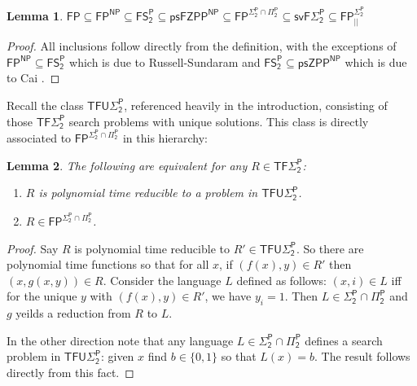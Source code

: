 \documentclass[11pt]{article}
\newtheorem{lemma}{Lemma}
\newcommand{\B}{\{0,1\}}
\begin{document}
\begin{lemma}\label{lem:inclusions}
$\mathsf{FP} \subseteq \mathsf{FP^{NP}} \subseteq \mathsf{FS_2^P} \subseteq \mathsf{psFZPP^{NP}} \subseteq \mathsf{FP^{\Sigma_2^P \cap \Pi_2^P}} \subseteq \mathsf{svF\Sigma_2^P} \subseteq \mathsf{FP_{||}^{\Sigma_2^P}}$
\end{lemma}
\begin{proof}
All inclusions follow directly from the definition, with the exceptions of $\mathsf{FP^{NP}} \subseteq \mathsf{FS_2^P}$ which is due to Russell-Sundaram \cite{russell-sundaram} and $\mathsf{FS_2^P} \subseteq \mathsf{psZPP^{NP}}$ which is due to Cai \cite{cai}.
\end{proof}

Recall the class $\mathsf{TFU\Sigma_2^P}$, referenced heavily in the introduction, consisting of those $\mathsf{TF\Sigma_2^P}$ search problems with unique solutions. This class is directly associated to $\mathsf{FP^{\Sigma_2^P \cap \Pi_2^P}} $ in this hierarchy:
\begin{lemma}\label{lem:unique-intersect}
The following are equivalent for any $R \in \mathsf{TF\Sigma_2^P}$:
\begin{enumerate}
    \item $R$ is polynomial time reducible to a problem in $\mathsf{TFU\Sigma_2^P}$.
    \item $R \in \mathsf{FP^{\Sigma_2^P \cap \Pi_2^P}}$.
\end{enumerate}
\end{lemma}
\begin{proof}
Say $R$ is polynomial time reducible to $R' \in \mathsf{TFU\Sigma_2^P}$. So there are polynomial time functions so that for all $x$, if $(f(x),y)\in R'$ then $(x,g(x,y))\in R$. Consider the language $L$ defined as follows: $(x,i) \in L$ iff for the unique $y$ with $(f(x),y)\in R'$, we have $y_i=1$. Then $L \in \mathsf{\Sigma_2^P \cap \Pi_2^P}$ and $g$ yeilds a reduction from $R$ to $L$.

In the other direction note that any language $L \in \mathsf{\Sigma_2^P \cap \Pi_2^P}$ defines a search problem in $\mathsf{TFU\Sigma_2^P}$: given $x$ find $b \in \B$ so that $L(x)=b$. The result follows directly from this fact. 
\end{proof}
\end{document}
